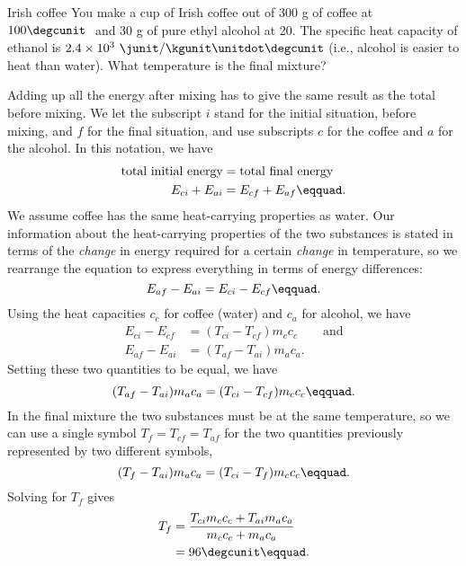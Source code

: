 \begin{eg}{Irish coffee}
\egquestion You make a cup of Irish coffee out of 300 g of
coffee at $100\degcunit\ $ and 30 g of pure ethyl alcohol at
20\degcunit. The specific heat capacity of ethanol is
$2.4\times10^3\ \junit/\kgunit\unitdot\degcunit$ (i.e., alcohol is easier
to heat than water). What temperature is the final mixture?

\eganswer Adding up all the energy after mixing has to give
the same result as the total before mixing. We let the
subscript $i$ stand for the initial situation, before
mixing, and $f$ for the final situation, and use subscripts
$c$ for the coffee and $a$ for the alcohol. In this notation, we have
\begin{align*}
 \text{total initial energy} &= \text{total final energy} \\
 E_{ci}+E_{ai} &= E_{cf}+E_{af}\eqquad.
\end{align*}
We assume coffee has the same heat-carrying properties as
water. Our information about the heat-carrying properties of
the two substances is stated in terms of the \emph{change} in
energy required for a certain \emph{change} in temperature, so we
rearrange the equation to express everything in terms
of energy differences:
\begin{equation*}
                E_{af}-E_{ai} =    E_{ci}-E_{cf}\eqquad.
\end{equation*}
Using the heat capacities $c_c$ for coffee (water) and $c_a$ for alcohol, we have
\begin{align*}
 E_{ci}-E_{cf} &= (T_{ci}-T_{cf})m_c c_c \qquad \text{and} \\
 E_{af}-E_{ai} &= (T_{af}-T_{ai})m_a c_a .
\end{align*}
Setting these two quantities to be equal, we have
\begin{equation*}
        (T_{af}-T_{ai})m_a c_a         =      (T_{ci}-T_{cf})m_c c_c\eqquad.
\end{equation*}
In the final mixture the two substances must be at the same
temperature, so we can use a single symbol $T_f=T_{cf}=T_{af}$
for the two quantities previously represented by two different symbols,
\begin{equation*}
                (T_f-T_{ai})m_a c_a         =      (T_{ci}-T_f)m_c c_c\eqquad.
\end{equation*}
Solving for $T_f$ gives
\begin{align*}
 T_f &= \frac{T_{ci}m_c c_c+T_{ai}m_a c_a}{m_c c_c+m_a c_a}\\
 &= 96\degcunit\eqquad.
\end{align*}
\end{eg}

